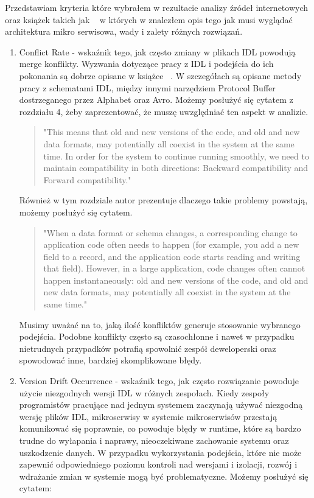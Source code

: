 \documentclass[runningheads,12pt]{llncs}
\begin{document}
Przedstawiam kryteria które wybrałem w rezultacie analizy źródeł internetowych oraz książek takich jak ~\cite{kleppmann2017designing} w których w znalezłem opis tego jak musi wyglądać architektura mikro serwisowa, wady i zalety różnych rozwiązań.

\begin{enumerate}
    \item Conflict Rate - wskaźnik tego, jak często zmiany w plikach IDL powodują merge konflikty. Wyzwania dotyczące pracy z IDL i podejścia do ich pokonania są dobrze opisane w książce ~\cite{kleppmann2017designing}. W szczegółach są opisane metody pracy z schematami IDL, między innymi narzędziem Protocol Buffer dostrzeganego przez Alphabet oraz Avro. Możemy posłużyć się cytatem z rozdziału 4, żeby zaprezentować, że muszę uwzględniać ten aspekt w analizie.
    \begin{quote}
        "This means that old and new versions of the code, and old and new data formats, may potentially all coexist in the system at the same time. In order for the system to continue running smoothly, we need to maintain compatibility in both directions: Backward compatibility and Forward compatibility." ~\cite[p. 112]{kleppmann2017designing}
    \end{quote}
    Również w tym rozdziale autor prezentuje dlaczego takie problemy powstają, możemy posłużyć się cytatem.
    \begin{quote}
        "When a data format or schema changes, a corresponding change to application code often needs to happen (for example, you add a new field to a record, and the application code starts reading and writing that field). However, in a large application, code changes often cannot happen instantaneously: old and new versions of the code, and old and new data formats, may potentially all coexist in the system at the same time." ~\cite[p. 111]{kleppmann2017designing}
    \end{quote}
    Musimy uważać na to, jaką ilość konfliktów generuje stosowanie wybranego podejścia. Podobne konflikty często są czasochłonne i nawet w przypadku nietrudnych przypadków potrafią spowolnić zespół deweloperski oraz spowodować inne, bardziej skomplikowane błędy.
    \item Version Drift Occurrence - wskaźnik tego, jak często rozwiązanie powoduje użycie niezgodnych wersji IDL w różnych zespołach. Kiedy zespoły programistów pracujące nad jednym systemem zaczynają używać niezgodną wersję plików IDL, mikroserwisy w systemie mikroserwisów przestają komunikować się poprawnie, co powoduje błędy w runtime, które są bardzo trudne do wyłapania i naprawy, nieoczekiwane zachowanie systemu oraz uszkodzenie danych. W przypadku wykorzystania podejścia, które nie może zapewnić odpowiedniego poziomu kontroli nad wersjami i izolacji, rozwój i wdrażanie zmian w systemie mogą być problematyczne. Możemy posłużyć się cytatem:

\end{enumerate}
\end{document}
